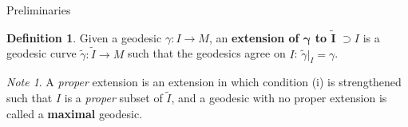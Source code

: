 \documentclass{article}
\newcommand{\fn}[3]{#1 \colon #2 \rightarrow #3}
\theoremstyle{definition}
\newtheorem{definition}{Definition}[section]
\theoremstyle{remark}
\newtheorem{remark}{Note}[section]
\begin{document}
\begin{section}{Preliminaries}
  \begin{definition}
    Given a geodesic $\fn \gamma I M$, an
    \textbf{extension of $\boldsymbol{\gamma}$ to $\boldsymbol{\widetilde I}$}
    $\supset I$ is a geodesic curve $\fn {\widetilde \gamma} {\widetilde I} M$
    such that the geodesics agree on $I$: $\widetilde \gamma|_I = \gamma$.
  \end{definition}
  \begin{remark}
    A \textit{proper} extension is an extension in which condition (i) is strengthened
    such that $I$ is a \textit{proper} subset of $\widetilde I$, and a geodesic
    with no proper extension is called a \textbf{maximal} geodesic.
  \end{remark}
\end{section}
\end{document}
